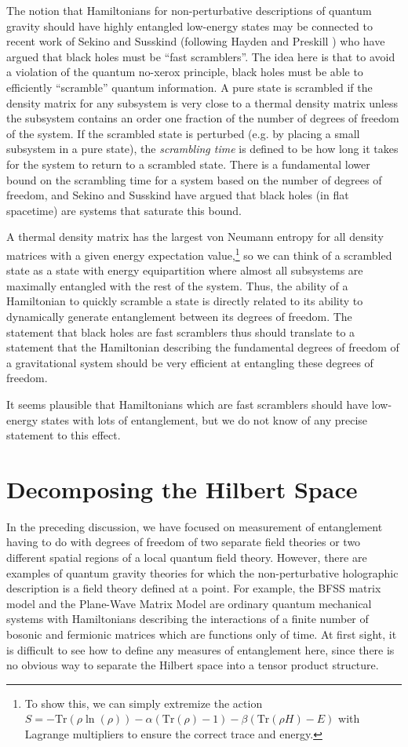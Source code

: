 \documentclass[12pt,epsf]{article}
\renewcommand{\(}{\left(}
\renewcommand{\)}{\right)}
\newcommand{\tr}{\mathrm{Tr}}
\begin{document}
The notion that Hamiltonians for non-perturbative descriptions of quantum gravity should have highly entangled low-energy states may be connected to recent work of Sekino and Susskind \cite{ss} (following Hayden and Preskill \cite{hp}) who have argued that black holes must be ``fast scramblers''. The idea here is that to avoid a violation of the quantum no-xerox principle, black holes must be able to efficiently ``scramble'' quantum information. A pure state is scrambled if the density matrix for any subsystem is very close to a thermal density matrix unless the subsystem contains an order one fraction of the number of degrees of freedom of the system. If the scrambled state is perturbed (e.g. by placing a small subsystem in a pure state), the {\it scrambling time} is defined to be how long it takes for the system to return to a scrambled state. There is a fundamental lower bound on the scrambling time for a system based on the number of degrees of freedom, and Sekino and Susskind have argued that black holes (in flat spacetime) are systems that saturate this bound.

A thermal density matrix has the largest von Neumann entropy for all density matrices with a given energy expectation value,\footnote{To show this, we can simply extremize the action $S = -\tr(\rho \ln(\rho)) - \alpha(\tr(\rho) - 1)  - \beta(\tr(\rho H) - E)$ with Lagrange multipliers to ensure the correct trace and energy.} so we can think of a scrambled state as a state with energy equipartition where almost all subsystems are maximally entangled with the rest of the system. Thus, the ability of a Hamiltonian to quickly scramble a state is directly related to its ability to dynamically generate entanglement between its degrees of freedom. The statement that black holes are fast scramblers thus should translate to a statement that the Hamiltonian describing the fundamental degrees of freedom of a gravitational system should be very efficient at entangling these degrees of freedom.

It seems plausible that Hamiltonians which are fast scramblers should have low-energy states with lots of entanglement, but we do not know of any precise statement to this effect.

\section{Decomposing the Hilbert Space}

In the preceding discussion, we have focused on measurement of entanglement having to do with degrees of freedom of two separate field theories or two different spatial regions of a local quantum field theory. However, there are examples of quantum gravity theories for which the non-perturbative holographic description is a field theory defined at a point. For example, the BFSS matrix model and the Plane-Wave Matrix Model are ordinary quantum mechanical systems with Hamiltonians describing the interactions of a finite number of bosonic and fermionic matrices which are functions only of time. At first sight, it is difficult to see how to define any measures of entanglement here, since there is no obvious way to separate the Hilbert space into a tensor product structure.
\end{document}
